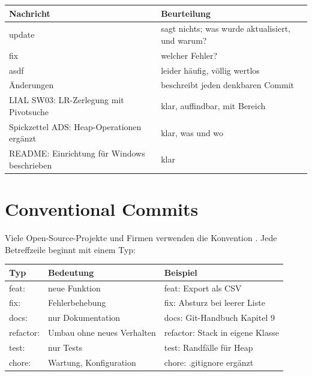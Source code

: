 \begin{center}
\renewcommand{\arraystretch}{1.3}
\begin{tabularx}{\linewidth}{@{}>{\ttfamily}l>{\raggedright\arraybackslash}X@{}}
  \toprule
  \normalfont\textbf{Nachricht} & \textbf{Beurteilung} \\
  \midrule
  update            & sagt nichts; was wurde aktualisiert, und warum? \\
  fix               & welcher Fehler? \\
  asdf              & leider häufig, völlig wertlos \\
  Änderungen        & beschreibt jeden denkbaren Commit \\
  \midrule
  LIAL SW03: LR-Zerlegung mit Pivotsuche     & klar, auffindbar, mit Bereich \\
  Spickzettel ADS: Heap-Operationen ergänzt  & klar, was und wo \\
  README: Einrichtung für Windows beschrieben & klar \\
  \bottomrule
\end{tabularx}
\end{center}

\section{Conventional Commits}

Viele Open-Source-Projekte und Firmen verwenden die Konvention . Jede Betreffzeile beginnt mit einem Typ:

\begin{center}
\renewcommand{\arraystretch}{1.25}
\begin{tabularx}{\linewidth}{@{}>{\ttfamily}l>{\raggedright\arraybackslash}X>{\ttfamily}l@{}}
  \toprule
  \normalfont\textbf{Typ} & \textbf{Bedeutung} & \normalfont\textbf{Beispiel} \\
  \midrule
  feat:     & neue Funktion          & feat: Export als CSV \\
  fix:      & Fehlerbehebung         & fix: Absturz bei leerer Liste \\
  docs:     & nur Dokumentation      & docs: Git-Handbuch Kapitel 9 \\
  refactor: & Umbau ohne neues Verhalten & refactor: Stack in eigene Klasse \\
  test:     & nur Tests              & test: Randfälle für Heap \\
  chore:    & Wartung, Konfiguration & chore: .gitignore ergänzt \\
  \bottomrule
\end{tabularx}
\end{center}

